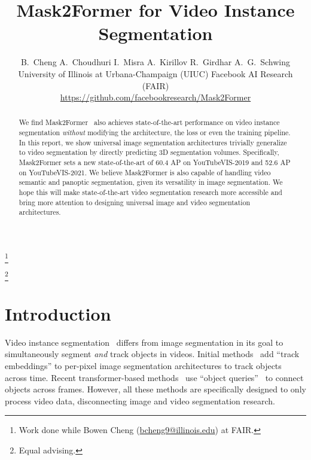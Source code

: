 \documentclass[10pt,twocolumn,letterpaper]{article}
\newcommand\blfootnote[1]{\begingroup\renewcommand\thefootnote{}\footnote{#1}\addtocounter{footnote}{-1}\endgroup}
\newcommand{\modelname}{Mask2Former\xspace}
\newcommand{\authorskip}{\hspace{2.5mm}}
\begin{document}
\title{\modelname for Video Instance Segmentation}


\author{
 B.~Cheng A.~Choudhuri \authorskip I.~Misra \authorskip
 A.~Kirillov \authorskip R.~Girdhar \authorskip A.~G.~Schwing \\
 University of Illinois at Urbana-Champaign (UIUC) \authorskip Facebook AI Research (FAIR)\\
 {\small \url{https://github.com/facebookresearch/Mask2Former}}
}

\maketitle
\blfootnote{ Work done while Bowen Cheng (\href{mailto:bcheng9@illinois.edu}{bcheng9@illinois.edu}) at FAIR.}
\blfootnote{Equal advising.}

\begin{abstract}
We find \modelname~\cite{cheng2021mask2former} also achieves state-of-the-art performance on video instance segmentation \emph{without} modifying the architecture, the loss or even the training pipeline. In this report, we show universal image segmentation architectures trivially generalize to video segmentation by directly predicting 3D segmentation volumes. Specifically, \modelname sets a new state-of-the-art of 60.4 AP on YouTubeVIS-2019 and 52.6 AP on YouTubeVIS-2021. 
We believe \modelname is also capable of handling video semantic and panoptic segmentation, given its versatility in image segmentation. We hope this will make state-of-the-art video segmentation research more accessible and bring more attention to designing universal image and video segmentation architectures.

\end{abstract}

\section{Introduction}
Video instance segmentation~\cite{yang2019video} differs from  image segmentation in its goal to simultaneously segment \emph{and} track objects in videos.
Initial methods~\cite{yang2019video,voigtlaender2019mots} add  ``track embeddings'' to per-pixel image segmentation architectures to track objects across time. Recent transformer-based methods~\cite{vistr,ifc,wu2021seqformer} use ``object queries''~\cite{detr} to  connect objects across frames. However, all these methods are specifically designed to only process video data, disconnecting image and video segmentation research.
\end{document}
